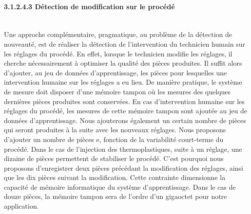 %

\paragraph{3.1.2.4.3 Détection de modification sur le procédé}\mbox{} \label{subsec:labelling_detection} \\
Une approche complémentaire, pragmatique, au problème de la détection de nouveauté, est de réaliser la détection de l'intervention du technicien humain sur les réglages du procédé.
En effet, lorsque le technicien modifie les réglages, il cherche nécessairement à optimiser la qualité des pièces produites.
Il suffit alors d'ajouter, au jeu de données d'apprentissage, les pièces pour lesquelles une intervention humaine sur les réglages a eu lieu.
De manière pratique, le système de mesure doit disposer d'une mémoire tampon où les mesures des quelques dernières pièces produites sont conservées.
En cas d'intervention humaine sur les réglages du procédé, les mesures de cette mémoire tampon sont ajoutée au jeu de données d'apprentissage.
Nous ajouterons également un certain nombre de pièces qui seront produites à la suite avec les nouveaux réglages.
Nous proposons d'ajouter un nombre de pièces e, fonction de la variabilité court-terme du procédé.
Dans le cas de l'injection des thermoplastiques, suite à un réglage, une dizaine de pièces permettent de stabiliser le procédé.
C'est pourquoi nous proposons d'enregistrer deux pièces précédant la modification des réglages, ainsi que les dix pièces suivant la modification.
Cette contrainte dimensionne la capacité de mémoire informatique du système d'apprentissage.
Dans le cas de douze pièces, la mémoire tampon sera de l'ordre d'un gigaoctet pour notre application.

